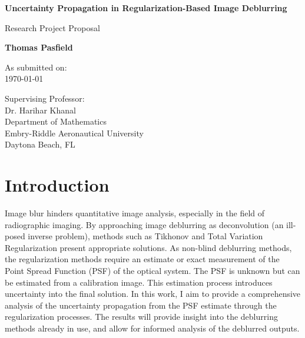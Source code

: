 \documentclass[letterpaper, 10pt, titlepage, twocolumn]{article}
\begin{document}
\begin{titlepage}
    \begin{center}
        \vspace*{1cm}

        \LARGE \textbf{Uncertainty Propagation in Regularization-Based Image Deblurring}

        \vspace{0.5cm}
        \Large Research Project Proposal
        
        \vspace{2.0cm}
        \large \textbf{Thomas Pasfield}

        \vspace{0.5cm}
        As submitted on:\\
        \today

        \vfill

        Supervising Professor:\\
        Dr. Harihar Khanal\\
        \vspace{1em}
        \normalsize Department of Mathematics\\
        Embry-Riddle Aeronautical University\\
        Daytona Beach, FL
    \end{center}
\end{titlepage}

\section*{Introduction}
Image blur hinders quantitative image analysis, especially in the field of radiographic imaging. By approaching image deblurring as deconvolution (an ill-posed inverse problem), methods such as Tikhonov and Total Variation Regularization present appropriate solutions. As non-blind deblurring methods, the regularization methods require an estimate or exact measurement of the Point Spread Function (PSF) of the optical system. The PSF is unknown but can be estimated from a calibration image. This estimation process introduces uncertainty into the final solution. In this work, I aim to provide a comprehensive analysis of the uncertainty propagation from the PSF estimate through the regularization processes. The results will provide insight into the deblurring methods already in use, and allow for informed analysis of the deblurred outputs.
\end{document}
